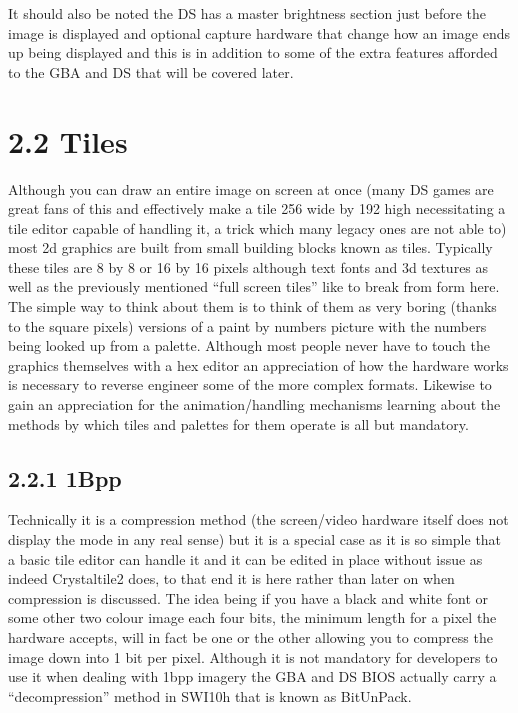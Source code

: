 \documentclass[
]{book}
\begin{document}
It should also be noted the DS has a master brightness section just before the image is displayed and optional capture hardware that change how an image ends up being displayed and this is in addition to some of the extra features afforded to the GBA and DS that will be covered later.

\hypertarget{tiles}{%
\section{2.2 Tiles}\label{tiles}}

Although you can draw an entire image on screen at once (many DS games are great fans of this and effectively make a tile 256 wide by 192 high necessitating a tile editor capable of handling it, a trick which many legacy ones are not able to) most 2d graphics are built from small building blocks known as tiles. Typically these tiles are 8 by 8 or 16 by 16 pixels although text fonts and 3d textures as well as the previously mentioned ``full screen tiles'' like to break from form here. The simple way to think about them is to think of them as very boring (thanks to the square pixels) versions of a paint by numbers picture with the numbers being looked up from a palette. Although most people never have to touch the graphics themselves with a hex editor an appreciation of how the hardware works is necessary to reverse engineer some of the more complex formats. Likewise to gain an appreciation for the animation/handling mechanisms learning about the methods by which tiles and palettes for them operate is all but mandatory.

\hypertarget{bpp}{%
\subsection{2.2.1 1Bpp}\label{bpp}}

Technically it is a compression method (the screen/video hardware itself does not display the mode in any real sense) but it is a special case as it is so simple that a basic tile editor can handle it and it can be edited in place without issue as indeed Crystaltile2 does, to that end it is here rather than later on when compression is discussed. The idea being if you have a black and white font or some other two colour image each four bits, the minimum length for a pixel the hardware accepts, will in fact be one or the other allowing you to compress the image down into 1 bit per pixel. Although it is not mandatory for developers to use it when dealing with 1bpp imagery the GBA and DS BIOS actually carry a ``decompression'' method in SWI10h that is known as BitUnPack.
\end{document}
